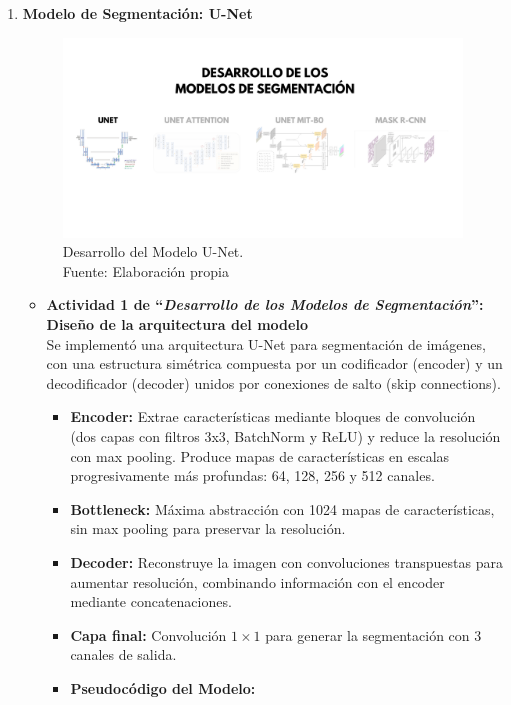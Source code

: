 \begin{enumerate}
  \item \textbf{Modelo de Segmentación: U-Net}
  \begin{figure}[H]
	\begin{center}
		\includegraphics[width=1\textwidth]{4/figures/desunet.png}
		\caption[Desarrollo del Modelo U-Net]{Desarrollo del Modelo U-Net.\\
		Fuente: Elaboración propia}
		\label{4:figdesunet}
	\end{center}
\end{figure}
  \begin{itemize}

  \item\textbf{Actividad 1 de “\textit{Desarrollo de los Modelos de Segmentación}”: Diseño de la arquitectura del modelo}
\\
  Se implementó una arquitectura U-Net para segmentación de imágenes, con una estructura simétrica compuesta por un codificador (encoder) y un decodificador (decoder) unidos por conexiones de salto (skip connections).
\begin{itemize}
\item \textbf{Encoder:} Extrae características mediante bloques de convolución (dos capas con filtros 3x3, BatchNorm y ReLU) y reduce la resolución con max pooling. Produce mapas de características en escalas progresivamente más profundas: 64, 128, 256 y 512 canales.
\item \textbf{Bottleneck:} Máxima abstracción con 1024 mapas de características, sin max pooling para preservar la resolución.
\item \textbf{Decoder:} Reconstruye la imagen con convoluciones transpuestas para aumentar resolución, combinando información con el encoder mediante concatenaciones.
\item \textbf{Capa final:} Convolución $1\times1$ para generar la segmentación con 3 canales de salida.
\item \textbf{Pseudocódigo del Modelo:}


\end{itemize}
\end{itemize}
\end{enumerate}
